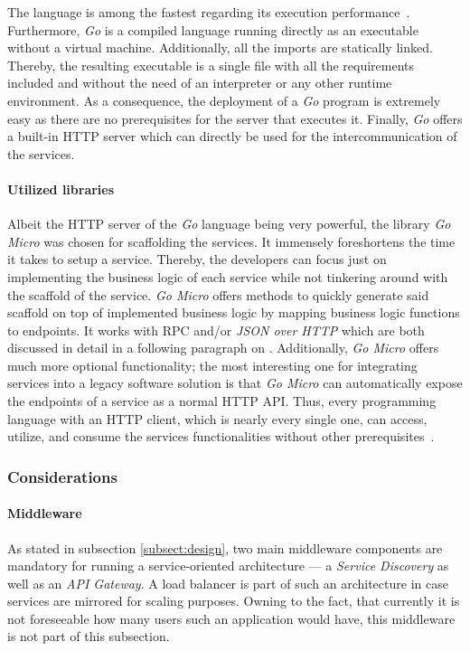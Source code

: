 \documentclass[12pt,a4paper,twoside]{report}
\begin{document}
The language is among the fastest regarding its execution performance~\cn.
Furthermore, \textit{Go} is a compiled language running directly as an executable
without a virtual machine. Additionally, all the imports are statically linked.
Thereby, the resulting executable is a single file with all the requirements
included and without the need of an interpreter or any other runtime environment.
As a consequence, the deployment of a \textit{Go} program is extremely easy as
there are no prerequisites for the server that executes it.
Finally, \textit{Go} offers a built-in HTTP server which can directly be used
for the intercommunication of the services.

\paragraph{Utilized libraries}
Albeit the HTTP server of the \textit{Go} language being very powerful,
the library \textit{Go Micro} was chosen for scaffolding the services.
It immensely foreshortens the time it takes to setup a service.
Thereby, the developers can focus just on implementing the business logic
of each service while not tinkering around with the scaffold of the service.
\textit{Go Micro} offers methods to quickly generate said scaffold on top
of implemented business logic by mapping business logic functions to endpoints.
It works with RPC and/or \textit{JSON over HTTP} which are both discussed
in detail in a following paragraph on \textit{}.
Additionally, \textit{Go Micro} offers much more optional functionality;
the most interesting one for integrating services into a legacy software solution
is that \textit{Go Micro} can automatically expose the endpoints of a service
as a normal HTTP API. Thus, every programming language with an HTTP client,
which is nearly every single one, can access, utilize, and consume the services
functionalities without other prerequisites~\cite{go-micro}.


\subsubsection{Considerations}

\paragraph{Middleware}
As stated in subsection \ref{subsect:design}, two main middleware components
are mandatory for running a service-oriented architecture ---
a \textit{Service Discovery} as well as an \textit{API Gateway}.
A load balancer is part of such an architecture in case services are mirrored
for scaling purposes. Owning to the fact, that currently it is not foreseeable
how many users such an application would have, this middleware is not part of
this subsection.
\end{document}
